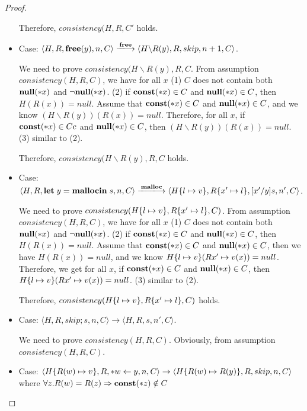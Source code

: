 \begin{proof}
\begin{itemize}
    Therefore, \(consistency(H, R, C'\) holds.

  \item Case: \(\langle H, R, \Free(y), n, C \rangle \xlongrightarrow{\Free}
    \langle H\backslash R(y), R, skip, n+1, C  \rangle \).

    We need to prove \(consistency(H\backslash R(y), R, C\). From
    assumption \(consistency(H, R, C)\), we have for all \(x\) (1)
    \(C\) does not contain both \({\bf null}(*x)\) and \(\neg{\bf null}(*x)\). (2) if
    \(\mathbf{const}(*x) \in C\) and \({\bf null}(*x) \in C\), then \(H(R(x)) =
    null\). Assume that \(\mathbf{const}(*x) \in C\) and \({\bf null}(*x) \in C\), and
    we know \((H\backslash R(y))(R(x)) = null\). Therefore, for all
    \(x\), if \(\mathbf{const}(*x) \in Cc\) and \({\bf null}(*x) \in C\), then
    \((H\backslash R(y))(R(x)) = null\). (3) similar to (2).

    Therefore, \(consistency(H\backslash R(y), R, C\) holds.
    
    
\item Case: \(\langle H, R, \LET y = \Malloc \IN s, n, C \rangle
  \xlongrightarrow{\Malloc} \langle H\set{l \mapsto v}, R\set{x'
    \mapsto l}, [x'/y]s, n', C \rangle \).

    We need to prove \(consistency(H\{l \mapsto v\}, R\{x'
      \mapsto l\}, C )\). From assumption \(consistency(H, R, C)\), we
    have for all \(x\) (1) \(C\) does not contain both \({\bf null}(*x)\) and
    \(\neg{\bf null}(*x)\). (2) if \(\mathbf{const}(*x) \in C\) and \({\bf null}(*x) \in C\),
    then \(H(R(x)) = null\). Assume that \(\mathbf{const}(*x) \in C\) and
    \({\bf null}(*x) \in C\), then we have \(H(R(x)) = null\), and we know
    \(H\{l \mapsto v\}(R{x' \mapsto v}(x)) = null \). Therefore, we
    get for all \(x\), if \(\mathbf{const}(*x) \in C \) and
    \({\bf null}(*x) \in C \), then \(H\{l \mapsto v\}(R{x'
      \mapsto v}(x)) = null \). (3) similar to (2).
                 
    Therefore, \(consistency(H\{l \mapsto v\}, R\{x' \mapsto l\},
    C )\) holds.

\item Case: \(\langle H, R, skip;s, n, C \rangle \rightarrow
    \langle H, R, s, n', C \rangle \).

    We need to prove \(consistency(H, R, C) \). Obviously, from
    assumption \(consistency(H, R, C) \).

\item Case: \(\langle H\{R(w) \mapsto v\}, R, *w \leftarrow y, n, C
  \rangle \rightarrow \langle H\{R(w) \mapsto R(y)\}, R, skip, n, C
  \rangle \) where \( \forall z. R(w) = R(z) \Rightarrow \mathbf{const}(*z)
  \notin C \)


\end{itemize}
\end{proof}
